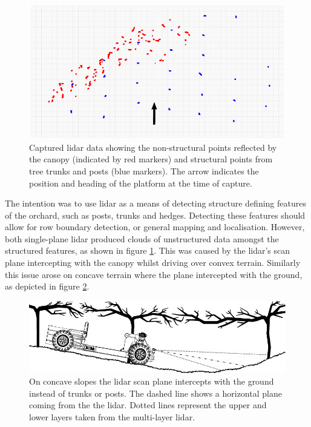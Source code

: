 \documentclass[preprint,authoryear,12pt]{elsarticle}
\begin{document}
        \begin{figure}[htb]
            \centering
            \includegraphics[width=\linewidth]{imgs/canopy_data/canopy_data.pdf}
            \caption{
                Captured lidar data showing the non-structural points reflected by the canopy (indicated by red markers) and structural points from tree trunks and posts (blue markers).
                The arrow indicates the position and heading of the platform at the time of capture.
            }
            \label{fig:canopyDataCloud}
        \end{figure}

        The intention was to use lidar as a means of detecting structure defining features of the orchard, such as posts, trunks and hedges.
        Detecting these features should allow for row boundary detection, or general mapping and localisation.
        However, both single-plane lidar produced clouds of unstructured data amongst the structured features, as shown in figure \ref{fig:canopyDataCloud}.
        This was caused by the lidar's scan plane intercepting with the canopy whilst driving over convex terrain.
        Similarly this issue arose on concave terrain where the plane intercepted with the ground, as depicted in figure \ref{fig:concaveSlope}.

        \begin{figure}[htb]
            \centering
            \includegraphics[width=\linewidth]{imgs/concave_slope/concave_slope_v4.pdf}
            \caption{
                On concave slopes the lidar scan plane intercepts with the ground instead of trunks or posts.
                The dashed line shows a horizontal plane coming from the the lidar.
                Dotted lines represent the upper and lower layers taken from the multi-layer lidar.
            }
            \label{fig:concaveSlope}
        \end{figure}
\end{document}
